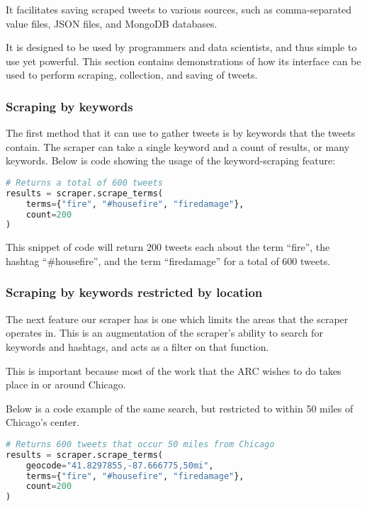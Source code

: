 \documentclass{article}
\begin{document}
It facilitates saving scraped tweets to various sources, such as comma-separated value files, JSON files, and MongoDB databases.

It is designed to be used by programmers and data scientists, and thus simple to use yet powerful. This section contains demonstrations of how its interface can be used to perform scraping, collection, and saving of tweets.

\subsubsection{Scraping by keywords}

The first method that it can use to gather tweets is by keywords that the tweets contain. The scraper can take a single keyword and a count of results, or many keywords. Below is code showing the usage of the keyword-scraping feature:

\begin{lstlisting}[language=Python,caption=Scraping multiple keywords]
# Returns a total of 600 tweets
results = scraper.scrape_terms(
    terms={"fire", "#housefire", "firedamage"}, 
    count=200
)
\end{lstlisting}

This snippet of code will return 200 tweets each about the term ``fire'', the hashtag ``\#housefire'', and the term ``firedamage'' for a total of 600 tweets.

\subsubsection{Scraping by keywords restricted by location}

The next feature our scraper has is one which limits the areas that the scraper operates in. This is an augmentation of the scraper's ability to search for keywords and hashtags, and acts as a filter on that function.

This is important because most of the work that the ARC wishes to do takes place in or around Chicago.

Below is a code example of the same search, but restricted to within 50 miles of Chicago's center.

\begin{lstlisting}[language=Python,caption=Geo-location scraping filter]
# Returns 600 tweets that occur 50 miles from Chicago
results = scraper.scrape_terms(
    geocode="41.8297855,-87.666775,50mi",
    terms={"fire", "#housefire", "firedamage"}, 
    count=200
)
\end{lstlisting}
\end{document}
